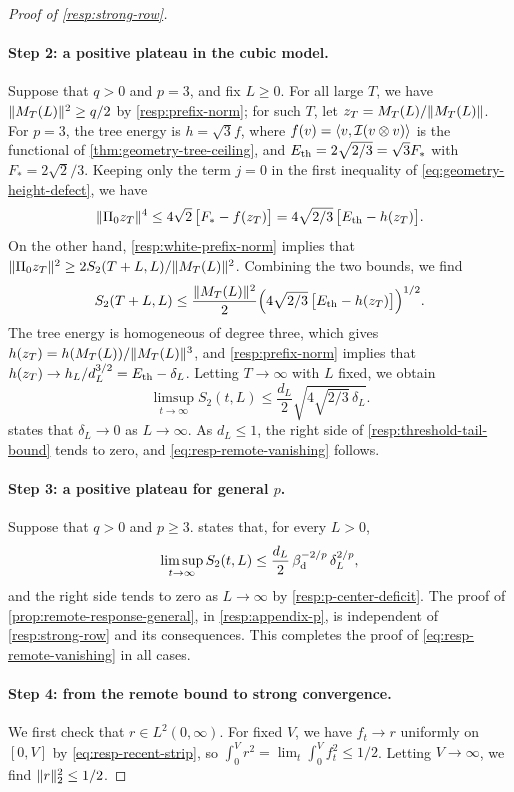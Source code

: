 \begin{proof}[Proof of \cref{resp:strong-row}]
\paragraph{Step 2: a positive plateau in the cubic model.}
Suppose that $q>0$ and $p=3$, and fix $L\ge0$. For all large $T$, we have $\lVert M_T(L)\rVert^2\ge q/2$ by \eqref{resp:prefix-norm}; for such $T$, let $z_T=M_T(L)/\lVert M_T(L)\rVert$. For $p=3$, the tree energy is $h=\sqrt3f$, where $f(v)=\left\langle v,\mathcal I(v\otimes v)\right\rangle$ is the functional of \cref{thm:geometry-tree-ceiling}, and $E_{\mathrm{th}}=2\sqrt{2/3}=\sqrt3F_*$ with $F_*=2\sqrt2/3$. Keeping only the term $j=0$ in the first inequality of \eqref{eq:geometry-height-defect}, we have
\[
 \lVert\Pi_0z_T\rVert^4\le4\sqrt2\,\bigl[F_*-f(z_T)\bigr]=4\sqrt{2/3}\,\bigl[E_{\mathrm{th}}-h(z_T)\bigr].
\]
On the other hand, \eqref{resp:white-prefix-norm} implies that $\lVert\Pi_0z_T\rVert^2\ge2S_2(T+L,L)/\lVert M_T(L)\rVert^2$. Combining the two bounds, we find
\[
 S_2(T+L,L)\le\frac{\lVert M_T(L)\rVert^2}2\Bigl(4\sqrt{2/3}\,\bigl[E_{\mathrm{th}}-h(z_T)\bigr]\Bigr)^{1/2}.
\]
The tree energy is homogeneous of degree three, which gives $h(z_T)=h(M_T(L))/\lVert M_T(L)\rVert^3$, and \eqref{resp:prefix-norm} implies that $h(z_T)\to h_L/d_L^{3/2}=E_{\mathrm{th}}-\delta_L$. Letting $T\to\infty$ with $L$ fixed, we obtain
\begin{equation}
 \limsup_{t\to\infty}S_2(t,L)
 \le\frac{d_L}2\sqrt{4\sqrt{2/3}\,\delta_L}.
 \label{resp:threshold-tail-bound}
\end{equation}
 states that $\delta_L\to0$ as $L\to\infty$. As $d_L\le1$, the right side of \eqref{resp:threshold-tail-bound} tends to zero, and \eqref{eq:resp-remote-vanishing} follows.

\paragraph{Step 3: a positive plateau for general $p$.}
Suppose that $q>0$ and $p\ge3$.  states that, for every $L>0$,
\[
 \limsup_{t\to\infty}S_2(t,L)\le\frac{d_L}2\,\beta_{\mathrm d}^{-2/p}\,\delta_L^{2/p},
\]
and the right side tends to zero as $L\to\infty$ by \eqref{resp:p-center-deficit}. The proof of \cref{prop:remote-response-general}, in \cref{resp:appendix-p}, is independent of \cref{resp:strong-row} and its consequences. This completes the proof of \eqref{eq:resp-remote-vanishing} in all cases.

\paragraph{Step 4: from the remote bound to strong convergence.}
We first check that $r\in L^2(0,\infty)$. For fixed $V$, we have $f_t\to r$ uniformly on $[0,V]$ by \eqref{eq:resp-recent-strip}, so $\int_0^Vr^2=\lim_t\int_0^Vf_t^2\le1/2$. Letting $V\to\infty$, we find $\lVert r\rVert_2^2\le1/2$.


\end{proof}
